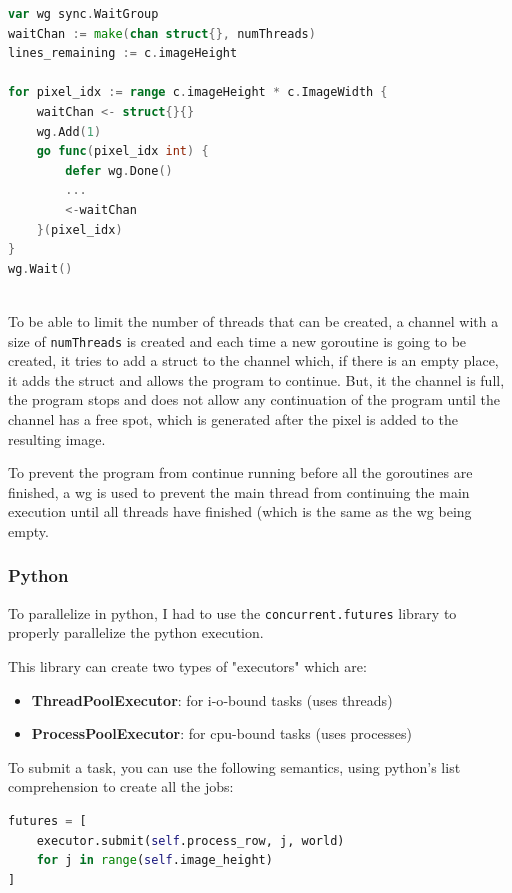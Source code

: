 \begin{lstlisting}[language=Go, caption={Goroutines.}, label={lst:go_goroutines_example}]
var wg sync.WaitGroup
waitChan := make(chan struct{}, numThreads)
lines_remaining := c.imageHeight

for pixel_idx := range c.imageHeight * c.ImageWidth {
    waitChan <- struct{}{}
    wg.Add(1)
    go func(pixel_idx int) { 
        defer wg.Done()
        ... 
        <-waitChan 
    }(pixel_idx)
}
wg.Wait()
    
\end{lstlisting}

To be able to limit the number of threads that can be created, a channel with a size of \texttt{numThreads} is created and each time a new \gls{goroutine} is going to be created, it tries to add a struct to the channel which, if there is an empty place, it adds the struct and allows the program to continue. But, it the channel is full, the program stops and does not allow any continuation of the program until the channel has a free spot, which is generated after the pixel is added to the resulting image.

To prevent the program from continue running before all the \glspl{goroutine} are finished, a \gls{wg} is used to prevent the main thread from continuing the main execution until all threads have finished (which is the same as the \gls{wg} being empty.

\subsubsection{Python}

To parallelize in python, I had to use the \texttt{concurrent.futures} library to properly parallelize the python execution.

This library can create two types of "executors" which are:
\begin{itemize}
    \item \textbf{ThreadPoolExecutor}: for \gls{i-o}-bound tasks (uses threads)
    \item \textbf{ProcessPoolExecutor}: for \gls{cpu}-bound tasks (uses processes)
\end{itemize}
To submit a task, you can use the following semantics, using python's list comprehension to create all the jobs:
\begin{lstlisting}[language=Python, caption={Python submiting jobs ProcessPoolExecutor.}, label={lst:python_executor_sumbit}]
futures = [
    executor.submit(self.process_row, j, world)
    for j in range(self.image_height)
]
\end{lstlisting}

